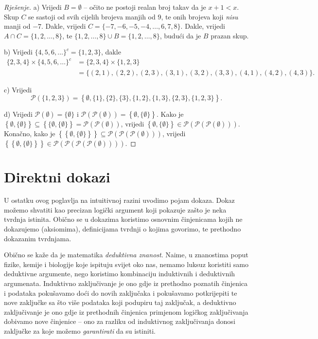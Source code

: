 \begin{proof}[Rješenje]
a) Vrijedi $B=\emptyset$ -- očito ne postoji realan broj takav da je $x+1<x$. Skup $C$ se sastoji od svih cijelih brojeva manjih od $9$, te onih brojeva koji \textit{nisu} manji od $-7$. Dakle, vrijedi $C=\{-7, -6, -5, -4, \dots, 6, 7, 8\}$. Dakle, vrijedi $A\cap C=\{1, 2, \dots, 8\}$, te $\{1, 2, \dots, 8\}\cup B=\{1, 2, \dots, 8\}$, budući da je $B$ prazan skup.

b) Vrijedi $\{4, 5, 6, \dots\}^c=\{1, 2, 3\}$, dakle 
\begin{align*}
\{2, 3, 4\}\times \{4, 5, 6, \dots\}^c&=\{2, 3, 4\}\times \{1, 2, 3\}\\
&=\{(2, 1), (2, 2), (2, 3), (3, 1), (3, 2), (3, 3), (4, 1), (4, 2), (4, 3)\}.
\end{align*}

c) Vrijedi
$$\mathcal{P}\left(\{1, 2, 3\}\right)=\left\{\emptyset, \{1\}, \{2\}, \{3\}, \{1, 2\}, \{1, 3\}, \{2, 3\}, \{1, 2, 3\}\right\}.$$

d) Vrijedi $\mathcal{P}(\emptyset)=\{\emptyset\}$ i $\mathcal{P}\left(\mathcal{P}\left(\emptyset\right)\right)=\left\{\emptyset, \{\emptyset\}\right\}$. Kako je $\left\{\emptyset, \{\emptyset\}\right\}\subseteq \left\{\{\emptyset, \{\emptyset\}\right\}=\mathcal{P}\left(\mathcal{P}\left(\emptyset\right)\right)$, vrijedi $\left\{\emptyset, \{\emptyset\}\right\}\in \mathcal{P}\left(\mathcal{P}\left(\mathcal{P}\left(\emptyset\right)\right)\right)$. Konačno, kako je $\left\{\left\{\emptyset, \{\emptyset\}\right\}\right\}\subseteq \mathcal{P}\left(\mathcal{P}\left(\mathcal{P}\left(\emptyset\right)\right)\right)$, vrijedi $\left\{\left\{\emptyset, \{\emptyset\}\right\}\right\}\in \mathcal{P}\left(\mathcal{P}\left(\mathcal{P}\left(\mathcal{P}\left(\emptyset\right)\right)\right)\right)$.
\end{proof}
\section{Direktni dokazi}
U ostatku ovog poglavlja na intuitivnoj razini uvodimo pojam dokaza. Dokaz možemo shvatiti kao precizan logički argument koji pokazuje zašto je neka tvrdnja istinita. Obično se u dokazima koristimo osnovnim činjenicama kojih ne dokazujemo (aksiomima), definicijama tvrdnji o kojima govorimo, te prethodno dokazanim tvrdnjama. 

Obično se kaže da je matematika \textit{deduktivna znanost}. Naime, u znanostima poput fizike, kemije i biologije koje ispituju svijet oko nas, nemamo luksuz koristiti samo deduktivne argumente, nego koristimo kombinaciju induktivnih i deduktivnih argumenata. Induktivno zaključivanje je ono gdje iz prethodno poznatih činjenica i podataka pokušavamo doći do novih zaključaka i pokušavamo potkrijepiti te nove zaključke sa što više podataka koji podupiru taj zaključak, a deduktivno zaključivanje je ono gdje iz prethodnih činjenica primjenom logičkog zaključivanja dobivamo nove činjenice -- ono za razliku od induktivnog zaključivanja donosi zaključke za koje možemo \textit{garantirati} da su istiniti. 

